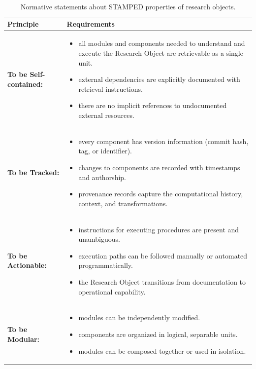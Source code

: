\documentclass{article}
\begin{document}
\begin{table}[ht]
\centering
\caption{Normative statements about STAMPED properties of research objects.}
\begin{tabular}{|l|p{10cm}|}
\hline
\textbf{Principle} & \textbf{Requirements} \\
\hline
\textbf{To be Self-contained:} &
\begin{itemize}[noitemsep,topsep=0pt,leftmargin=*]
  \item all modules and components needed to understand and execute the Research Object are retrievable as a single unit.
  \item external dependencies are explicitly documented with retrieval instructions.
  \item there are no implicit references to undocumented external resources.
\end{itemize} \\
\hline
\textbf{To be Tracked:} &
\begin{itemize}[noitemsep,topsep=0pt,leftmargin=*]
  \item every component has version information (commit hash, tag, or identifier).
  \item changes to components are recorded with timestamps and authorship.
  \item provenance records capture the computational history, context, and transformations.
\end{itemize} \\
\hline
\textbf{To be Actionable:} &
\begin{itemize}[noitemsep,topsep=0pt,leftmargin=*]
  \item instructions for executing procedures are present and unambiguous.
  \item execution paths can be followed manually or automated programmatically.
  \item the Research Object transitions from documentation to operational capability.
\end{itemize} \\
\hline
\textbf{To be Modular:} &
\begin{itemize}[noitemsep,topsep=0pt,leftmargin=*]
  \item modules can be independently modified.
  \item components are organized in logical, separable units.
  \item modules can be composed together or used in isolation.
\end{itemize} \\

\end{tabular}
\end{table}
\end{document}
